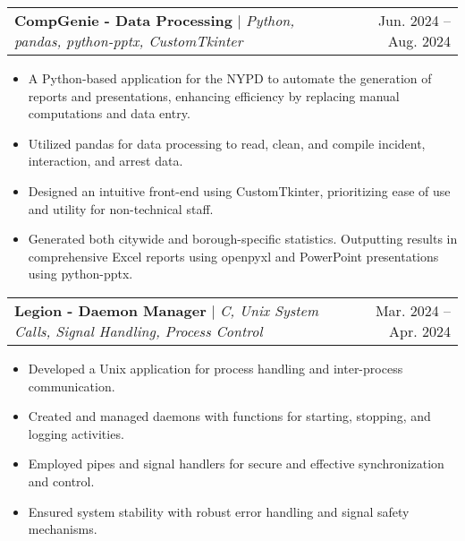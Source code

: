 \documentclass[letterpaper,11pt]{article}
\makeatletter
\newcommand{\resumeItem}[1]{
    \item\small{
      {#1 \vspace{-2pt}}
    }
  }
\newcommand{\resumeProjectHeading}[2]{
      \item
      \begin{tabular*}{0.97\textwidth}{l@{\extracolsep{\fill}}r}
        \small#1 & #2 \\
      \end{tabular*}\vspace{-7pt}
  }
\newcommand{\resumeItemListStart}{\begin{itemize}}
\newcommand{\resumeItemListEnd}{\end{itemize}\vspace{-5pt}}
\makeatother
\begin{document}
\resumeProjectHeading
{\textbf{CompGenie - Data Processing} $|$ \emph{Python, pandas, python-pptx, CustomTkinter}}{Jun. 2024 -- Aug. 2024}
\resumeItemListStart
\resumeItem{A Python-based application for the NYPD to automate the generation of reports and presentations,
  enhancing efficiency by replacing manual computations and data entry.}
\resumeItem{Utilized pandas for data processing to read, clean, and compile incident, interaction, and arrest data.}
\resumeItem{Designed an intuitive front-end using CustomTkinter, prioritizing ease of use and utility for non-technical staff.}
\resumeItem{Generated both citywide and borough-specific statistics. Outputting results in comprehensive Excel reports using openpyxl and PowerPoint presentations using python-pptx.}

\resumeItemListEnd
\resumeProjectHeading
{\textbf{Legion - Daemon Manager} $|$ \emph{C, Unix System Calls, Signal Handling, Process Control}}{Mar. 2024 -- Apr. 2024}
\resumeItemListStart
\resumeItem{Developed a Unix application for process handling and inter-process communication. }
\resumeItem{Created and managed daemons with functions for starting, stopping, and logging activities.}
\resumeItem{Employed pipes and signal handlers for secure and effective synchronization and control.}
\resumeItem{Ensured system stability with robust error handling and signal safety mechanisms.}
\resumeItemListEnd
\end{document}
